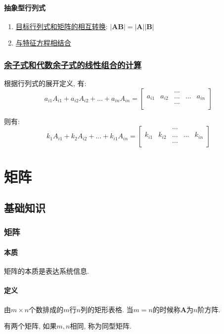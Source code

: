 \subsubsection{抽象型行列式}
\begin{enumerate}
\item \hyperref[目标行列式和矩阵的相互转换]{目标行列式和矩阵的相互转换}: $|\bm{A}\bm{B}|=|\bm{A}||\bm{B}|$
\item \hyperref[与特征方程相结合]{与特征方程相结合}
\end{enumerate}
\subsection{\hyperref[余子式和代数余子式的线性组合的计算]{余子式和代数余子式的线性组合的计算}}
根据行列式的展开定义, 有:
\begin{equation*}
a_{i1}A_{i1}+a_{i2}A_{i2}+...+a_{in}A_{in}=
\begin{bmatrix}
&  & \dots &  & \\
a_{i1} & a_{i2} & \dots & \dots & a_{in} \\
&  & \dots &  & \\
\end{bmatrix}
\end{equation*}\par
则有:
\begin{equation*}
k_{1}A_{i1}+k_{2}A_{i2}+...+k_{i1}A_{in}=
\begin{bmatrix}
&  & \dots &  & \\
k_{i1} & k_{i2} & \dots & \dots & k_{in} \\
&  & \dots &  & \\
\end{bmatrix}
\end{equation*}
\chapter{矩阵}
\section{基础知识}
\subsection{矩阵}
\subsubsection{本质}
矩阵的本质是表达系统信息.
\subsubsection{定义}
由$ m\times n $个数排成的$ m $行$ n $列的矩形表格. 当$ m=n $的时候称$ \bm{A} $为$ n $阶方阵.\par 有两个矩阵, 如果$ m,n $相同, 称为同型矩阵.

